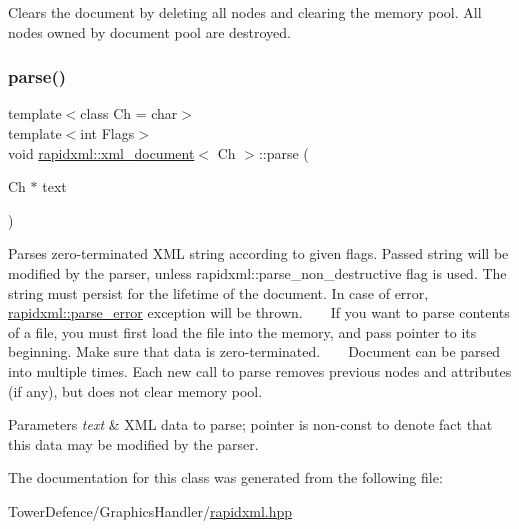 Clears the document by deleting all nodes and clearing the memory pool. All nodes owned by document pool are destroyed. \mbox{\label{classrapidxml_1_1xml__document_ac6e73ff9ac323bf5a370c38feb03a6b1}} 
\subsubsection{\texorpdfstring{parse()}{parse()}}
{\footnotesize\ttfamily template$<$class Ch  = char$>$ \\
template$<$int Flags$>$ \\
void \mbox{\hyperlink{classrapidxml_1_1xml__document}{rapidxml\+::xml\+\_\+document}}$<$ Ch $>$\+::parse (\begin{DoxyParamCaption}\item[{Ch $\ast$}]{text }\end{DoxyParamCaption})\hspace{0.3cm}{\ttfamily [inline]}}

Parses zero-\/terminated X\+ML string according to given flags. Passed string will be modified by the parser, unless rapidxml\+::parse\+\_\+non\+\_\+destructive flag is used. The string must persist for the lifetime of the document. In case of error, \mbox{\hyperlink{classrapidxml_1_1parse__error}{rapidxml\+::parse\+\_\+error}} exception will be thrown. ~\newline
~\newline
 If you want to parse contents of a file, you must first load the file into the memory, and pass pointer to its beginning. Make sure that data is zero-\/terminated. ~\newline
~\newline
 Document can be parsed into multiple times. Each new call to parse removes previous nodes and attributes (if any), but does not clear memory pool. 
\begin{DoxyParams}{Parameters}
{\em text} & X\+ML data to parse; pointer is non-\/const to denote fact that this data may be modified by the parser. \\
\hline
\end{DoxyParams}


The documentation for this class was generated from the following file\+:\begin{DoxyCompactItemize}
\item 
Tower\+Defence/\+Graphics\+Handler/\mbox{\hyperlink{rapidxml_8hpp}{rapidxml.\+hpp}}\end{DoxyCompactItemize}
